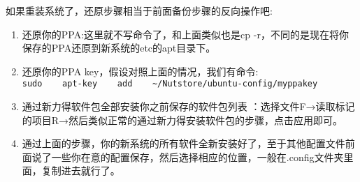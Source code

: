 如果重装系统了，还原步骤相当于前面备份步骤的反向操作吧:
\begin{enumerate}
\item 还原你的PPA:这里就不写命令了，和上面类似也是cp   -r，不同的是现在将你保存的PPA还原到新系统的etc的apt目录下。
\item 还原你的PPA key，假设对照上面的情况，我们有命令:\\
\verb+sudo    apt-key    add    ~/Nutstore/ubuntu-config/myppakey+
\item 通过新力得软件包全部安装你之前保存的软件包列表 ：选择文件F→读取标记的项目R→然后类似正常的通过新力得安装软件包的步骤，点击应用即可。
\item 通过上面的步骤，你的新系统的所有软件全新安装好了，至于其他配置文件前面说了一些你在意的配置保存，然后选择相应的位置，一般在.config文件夹里面，复制进去就行了。
\end{enumerate}


\printendnotes

